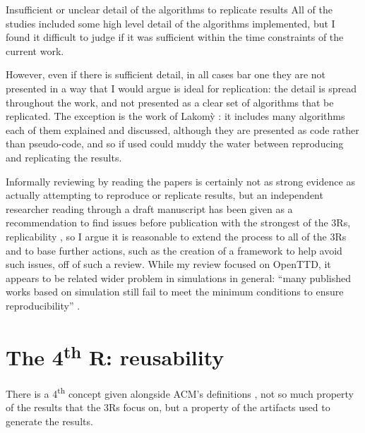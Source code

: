 \documentclass[logo,msc,dsti]{style/infthesis}    %
\begin{document}
{\begin{enumerate}
\begin{descitem}{Insufficient or unclear detail of the algorithms to replicate results}
All of the studies included some high level detail of the algorithms implemented, but I found it difficult to judge if it was sufficient within the time constraints of the current work.

However, even if there is sufficient detail, in all cases bar one they are not presented in a way that I would argue is ideal for replication: the detail is spread throughout the work, and not presented as a clear set of algorithms that be replicated. The exception is the work of {Lakom{\`y}} \cite{lakomy2020railroad}: it includes many algorithms each of them explained and discussed, although they are presented as code rather than pseudo-code, and so if used could muddy the water between reproducing and replicating the results.
\end{descitem}

\end{enumerate}

Informally reviewing by reading the papers is certainly not as strong evidence as actually attempting to reproduce or replicate results, but an independent researcher reading through a draft manuscript has been given as a recommendation to find issues before publication with the strongest of the 3Rs, replicability \cite{luijken2024replicability}, so I argue it is reasonable to extend the process to all of the 3Rs and to base further actions, such as the creation of a framework to help avoid such issues, off of such a review. While my review focused on OpenTTD, it appears to be related wider problem in simulations in general: ``many published works based on simulation still fail to meet the minimum conditions to ensure reproducibility'' \cite{dalle2012reproducibility}.

\section{The 4\texorpdfstring{\textsuperscript{th}}{th} R: reusability}

There is a 4\textsuperscript{th} concept given alongside ACM's definitions \cite{association_for_computing_machiner_new_2020}, not so much property of the results that the 3Rs focus on, but a property of the artifacts used to generate the results.

}
\end{document}
